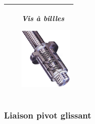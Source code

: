 \documentclass[10pt,oneside]{article}
\begin{document}
\begin{center}
\begin{tabular}{p{} c p{}}
\\
\hline 
&&
\begin{center}
\textit{Vis à billles}

\includegraphics[height=3cm]{png/visbilles} 
\end{center}\\
\hline 
\end{tabular}
\end{center}

\subsubsection{Liaison pivot glissant}
\end{document}

